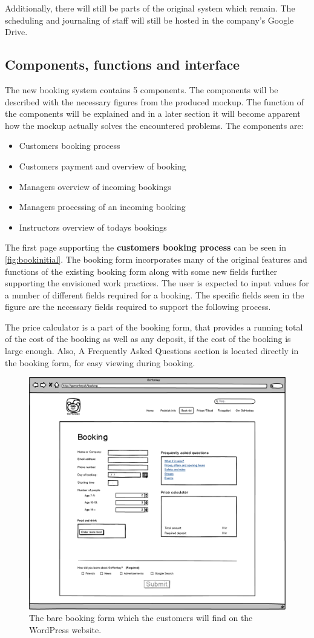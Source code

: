 Additionally, there will still be parts of the original system which remain. 
The scheduling and journaling of staff will still be hosted in the company's 
Google Drive. 

\subsection{Components, functions and interface}
The new booking system contains 5 components. The components will be described 
with the necessary figures from the produced mockup. The function of the 
components will be explained and in a later section it will become apparent
how the mockup actually solves the encountered problems. The components are:

\begin{itemize}
\item Customers booking process
\item Customers payment and overview of booking
\item Managers overview of incoming bookings
\item Managers processing of an incoming booking
\item Instructors overview of todays bookings
\end{itemize}

The first page supporting the \textbf{customers booking process} can be seen in \autoref{fig:bookinitial}. The booking
form incorporates many of the original features and functions of the existing 
\gomonkey booking form along with some new fields further supporting the envisioned work practices. 
The user is expected to input values for a number of 
different fields required for a booking. The specific fields seen in the figure
are the necessary fields required to support the following process.

The price calculator is a part of the booking form, that provides 
a running total of the cost of the booking as well as any deposit, if the cost
of the booking is large enough. Also, A Frequently Asked Questions section is 
located directly in the booking form, for easy viewing during booking.

\begin{figure}[htbp]
    \centering
        \includegraphics[width=.6\textwidth]{figures/mockup/booking_initial.png}
	    \caption{The bare booking form which the customers will find on the WordPress website.}
        \label{fig:bookinitial}
\end{figure}



